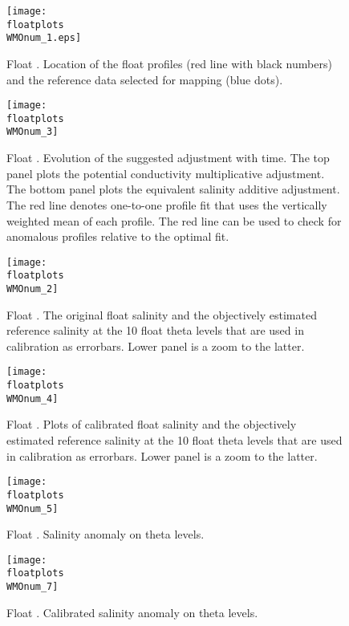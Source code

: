 \documentclass{article}
\begin{document}
\begin{figure}[ph]
  \centering    
  \texttt{[image: \\floatplots\\WMOnum\_1.eps]}
  \caption{Float \WMOnum. Location of the float profiles (red line with
  black numbers) and the reference data selected for mapping (blue
  dots).}
  \label{trajectory}
\end{figure}
\begin{figure}[ph]
    \centering    
    \texttt{[image: \\floatplots\\WMOnum\_3]}
    \caption{Float \WMOnum. Evolution of the suggested adjustment with
    time. The top panel plots the potential conductivity multiplicative
    adjustment. The bottom panel plots the equivalent salinity additive
    adjustment. The red line denotes one-to-one profile fit that uses the
    vertically weighted mean of each profile. The red line can be used to
    check for anomalous profiles relative to the optimal fit.} 
    \label{SalWithErrors}
\end{figure}
\begin{figure}[p]
    \centering    
    \texttt{[image: \\floatplots\\WMOnum\_2]}
    \caption{Float \WMOnum. The original float salinity and the
      objectively estimated reference salinity at the 10 float theta
      levels that are used in calibration as errorbars. Lower panel is a
      zoom to the latter.}
    \label{uncalibVsSalinity}
\end{figure}
\begin{figure}[p]
    \centering    
    \texttt{[image: \\floatplots\\WMOnum\_4]}
    \caption{Float \WMOnum. Plots of calibrated float salinity and the
      objectively estimated reference salinity at the 10 float theta
      levels that are used in calibration as errorbars. Lower panel is a
      zoom to the latter.}
    \label{CalibVsSalinity}
\end{figure}
\begin{figure}[p]
    \centering     
    \texttt{[image: \\floatplots\\WMOnum\_5]}
    \caption{Float \WMOnum. Salinity anomaly on theta levels.}
    \label{SalAnomOnTheta}
\end{figure}
\begin{figure}[p]
    \centering    
    \texttt{[image: \\floatplots\\WMOnum\_7]}
    \caption{Float \WMOnum.  Calibrated salinity anomaly on theta levels.}
    \label{CalibSalAnomOnTheta}
\end{figure}
\end{document}
